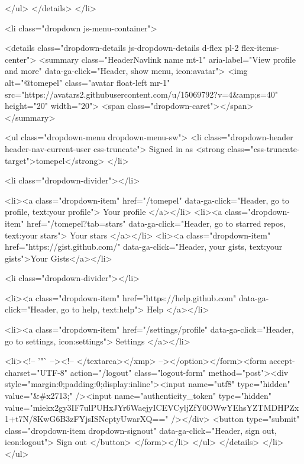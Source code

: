       </ul>
    </details>
  </li>

  <li class="dropdown js-menu-container">

    <details class="dropdown-details js-dropdown-details d-flex pl-2 flex-items-center">
      <summary class="HeaderNavlink name mt-1"
        aria-label="View profile and more"
        data-ga-click="Header, show menu, icon:avatar">
        <img alt="@tomepel" class="avatar float-left mr-1" src="https://avatars2.githubusercontent.com/u/15069792?v=4&amp;s=40" height="20" width="20">
        <span class="dropdown-caret"></span>
      </summary>

      <ul class="dropdown-menu dropdown-menu-sw">
        <li class="dropdown-header header-nav-current-user css-truncate">
          Signed in as <strong class="css-truncate-target">tomepel</strong>
        </li>

        <li class="dropdown-divider"></li>

        <li><a class="dropdown-item" href="/tomepel" data-ga-click="Header, go to profile, text:your profile">
          Your profile
        </a></li>
        <li><a class="dropdown-item" href="/tomepel?tab=stars" data-ga-click="Header, go to starred repos, text:your stars">
          Your stars
        </a></li>
          <li><a class="dropdown-item" href="https://gist.github.com/" data-ga-click="Header, your gists, text:your gists">Your Gists</a></li>

        <li class="dropdown-divider"></li>

        <li><a class="dropdown-item" href="https://help.github.com" data-ga-click="Header, go to help, text:help">
          Help
        </a></li>

        <li><a class="dropdown-item" href="/settings/profile" data-ga-click="Header, go to settings, icon:settings">
          Settings
        </a></li>

        <li><!-- '"` --><!-- </textarea></xmp> --></option></form><form accept-charset="UTF-8" action="/logout" class="logout-form" method="post"><div style="margin:0;padding:0;display:inline"><input name="utf8" type="hidden" value="&#x2713;" /><input name="authenticity_token" type="hidden" value="miekx2gy3IF7ulPUHxJYr6WaejyICEVCyljZfY0OWwYEhsYZTMDHPZx1+t7N/8KwG6B3zFYjsISNcptyUwarXQ==" /></div>
          <button type="submit" class="dropdown-item dropdown-signout" data-ga-click="Header, sign out, icon:logout">
            Sign out
          </button>
        </form></li>
      </ul>
    </details>
  </li>
</ul>


